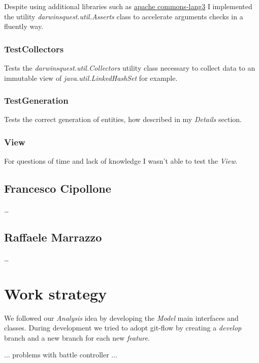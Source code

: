 \documentclass[12pt, a4paper]{report}
\begin{document}
    Despite using additional libraries such as \href{https://commons.apache.org/proper/commons-lang/}{apache commons-lang3}
    I implemented the utility \emph{darwinsquest.util.Asserts} class to accelerate arguments checks in a fluently way.

    \subsubsection{TestCollectors}
    
    Tests the \emph{darwinsquest.util.Collectors} utility class necessary to collect data to an immutable view of \emph{java.util.LinkedHashSet} for example.

    \subsubsection{TestGeneration}
    
    Tests the correct generation of entities, how described in my \emph{Details} section.

    \subsubsection{View}

    For questions of time and lack of knowledge I wasn't able to test the \emph{View}.

    \subsection*{Francesco Cipollone}

    \dots

    \subsection*{Raffaele Marrazzo}

    \dots

\section{Work strategy}

    We followed our \emph{Analysis} idea by developing the \emph{Model} main interfaces and classes.
    During development we tried to adopt git-flow by creating a \emph{develop} branch and a new branch for each new \emph{feature}.

    ... problems with battle controller ...
\end{document}
